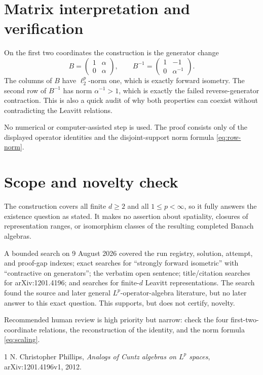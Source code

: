 \documentclass[11pt]{article}
\begin{document}
\section{Matrix interpretation and verification}

On the first two coordinates the construction is the generator change
\[
 B=\begin{pmatrix}1&\alpha\\0&\alpha\end{pmatrix},
 \qquad
 B^{-1}=\begin{pmatrix}1&-1\\0&\alpha^{-1}\end{pmatrix}.
\]
The columns of $B$ have $\ell^p_2$-norm one, which is exactly forward
isometry. The second row of $B^{-1}$ has norm $\alpha^{-1}>1$, which is
exactly the failed reverse-generator contraction. This is also a quick audit
of why both properties can coexist without contradicting the Leavitt
relations.

No numerical or computer-assisted step is used. The proof consists only of
the displayed operator identities and the disjoint-support norm formula
\eqref{eq:row-norm}.

\section{Scope and novelty check}

The construction covers all finite $d\ge2$ and all $1\le p<\infty$, so it
fully answers the existence question as stated. It makes no assertion about
spatiality, closures of representation ranges, or isomorphism classes of the
resulting completed Banach algebras.

A bounded search on 9 August 2026 covered the run registry, solution,
attempt, and proof-gap indexes; exact searches for ``strongly forward
isometric'' with ``contractive on generators''; the verbatim open sentence;
title/citation searches for arXiv:1201.4196; and searches for finite-$d$
Leavitt representations. The search found the source and later general
$L^p$-operator-algebra literature, but no later answer to this exact question.
This supports, but does not certify, novelty.

Recommended human review is high priority but narrow: check the four
first-two-coordinate relations, the reconstruction of the identity, and the
norm formula \eqref{eq:scaling}.

\begin{thebibliography}{1}
N. Christopher Phillips,
\emph{Analogs of Cuntz algebras on $L^p$ spaces},
arXiv:1201.4196v1, 2012.
\end{thebibliography}
\end{document}
